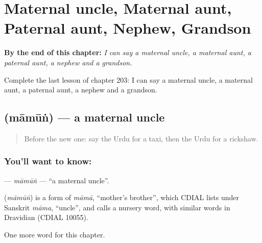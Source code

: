 
\chapter{Maternal uncle, Maternal aunt, Paternal aunt, Nephew, Grandson}
\label{ch:ur-maternal-uncle-maternal-aunt-paternal-aunt-nephew-grandson}

\begin{chapteropening}
\textbf{By the end of this chapter:} \emph{I can say a maternal uncle, a maternal aunt, a paternal aunt, a nephew and a grandson.}

Complete the last lesson of chapter 203: I can say a maternal uncle, a maternal aunt, a paternal aunt, a nephew and a grandson.
\end{chapteropening}

\section[\texorpdfstring{\ur{ماموں} (māmūṅ)}{ماموں (māmūṅ)}]{ (māmūṅ) — a maternal uncle}

\label{lesson:UR-C203-mamun}



\begin{quote}
Before the new one: say the Urdu for a taxi, then the Urdu for a rickshaw.
\end{quote}

\subsection*{You'll want to know: }
\textbf{} — \emph{māmūṅ} — \textquotedblleft{}a maternal uncle\textquotedblright{}.

\begin{cousinweb}
\textbf{} (\emph{māmūṅ}) is a form of \emph{māmā}, \textquotedblleft{}mother's brother\textquotedblright{}, which CDIAL lists under Sanskrit \emph{māma}, \textquotedblleft{}uncle\textquotedblright{}, and calls a nursery word, with similar words in Dravidian (CDIAL 10055).
\end{cousinweb}

\begin{grammarlens}[title={What you've built}]
One more word for this chapter.
\end{grammarlens}


